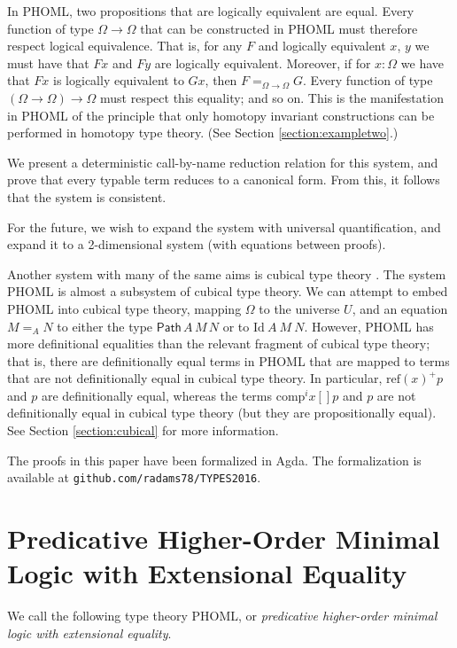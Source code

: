 \documentclass[a4paper,UKenglish]{lipics-v2016}
\newcommand*{\reff}[1]{\ensuremath{\mathrm{ref} \left( {#1} \right)}}
\newcommand{\Path}[3]{\ensuremath{\mathsf{Path} \, {#1} \, {#2} \, {#3}}}
\theoremstyle{plain}
\theoremstyle{definition}
\begin{document}
In PHOML, two propositions that are logically equivalent are equal.  Every function of type $\Omega \rightarrow \Omega$ that can be constructed in PHOML must therefore respect logical equivalence.  That is, for any $F$ and logically equivalent $x$, $y$ we must have that $Fx$ and $Fy$ are logically equivalent. Moreover, if for $x:\Omega$ we have that $Fx$ is logically equivalent to $Gx$, then $F =_{\Omega\to\Omega} G$.
Every function of type $(\Omega \rightarrow \Omega) \rightarrow \Omega$ must respect this equality; and so on.  This is the manifestation in PHOML of the principle that only homotopy invariant constructions can be performed in homotopy type theory.  (See Section \ref{section:exampletwo}.)

We present a deterministic call-by-name reduction relation for this system, and prove that every typable term reduces to a canonical form.  From this, it follows that the system is consistent.  

For the future, we wish to expand the system with universal quantification, and expand it to a 2-dimensional system (with equations between proofs).

Another system with many of the same aims is cubical type theory \cite{cchm:cubical}.  The system PHOML is almost a subsystem of cubical type theory.  We can attempt to embed PHOML into cubical type theory,
mapping $\Omega$ to the universe $U$, and an equation $M =_A N$ to either the type $\Path{A}{M}{N}$ or to $\mathrm{Id}\ A\ M\ N$.  However, PHOML has more definitional equalities than the relevant fragment of cubical type theory; that is, there are definitionally equal terms in PHOML that are mapped to terms that are not definitionally equal in cubical type theory.  In particular, $\reff{x}^+ p$ and $p$ are definitionally equal, whereas the terms $\mathrm{comp}^i x [] p$ and $p$ are not definitionally equal in cubical type theory (but they are propositionally equal).  See Section \ref{section:cubical} for more information.

The proofs in this paper have been formalized in Agda.  The formalization is available at \texttt{github.com/radams78/TYPES2016}.

\section{Predicative Higher-Order Minimal Logic with Extensional Equality}

We call the following type theory PHOML, or \emph{predicative higher-order minimal logic with extensional equality}.  
\end{document}
